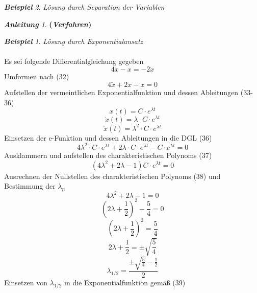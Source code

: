 \documentclass[a4paper,11pt]{article}
\theoremstyle{remark}
\newtheorem{example}{\textbf{Beispiel}}[section]
\newtheorem{guide}{\textbf{Anleitung}}[section]
\begin{document}
\begin{example}{\textit{Lösung durch Separation der Variablen}}
\begin{guide}{\textbf{(\textit{Verfahren})}}
\begin{equation}
\end{equation}
\vspace{0,5cm}
\begin{example}{\textit{Lösung durch Exponentialansatz}} \\ \\
Es sei folgende Differentialgleichung gegeben
\begin{equation}
4\ddot{x}-x=-2\dot{x}
\end{equation}
Umformen nach (32)
\begin{equation}
4\ddot{x}+2\dot{x}-x=0
\end{equation}
Aufstellen der vermeintlichen Exponentialfunktion und dessen Ableitungen (33-36)
\begin{equation}
x(t)=C\cdot e^{\lambda t}
\end{equation}
\begin{equation}
\dot{x}(t)=\lambda \cdot C\cdot e^{\lambda t}
\end{equation}
\begin{equation}
\ddot{x}(t)=\lambda^2 \cdot C\cdot e^{\lambda t}
\end{equation}
Einsetzen der e-Funktion und dessen Ableitungen in die DGL (36)
\begin{equation}
4\lambda^2 \cdot C\cdot e^{\lambda t}+2\lambda \cdot C\cdot e^{\lambda t}-C\cdot e^{\lambda t}=0
\end{equation}
Ausklammern und aufstellen des charakteristischen Polynoms (37)
\begin{equation}
(4\lambda^2+2\lambda-1)C\cdot e^{\lambda t}=0
\end{equation}
Ausrechnen der Nullstellen des charakteristischen Polynoms (38) und Bestimmung der $\lambda_n$
\begin{equation}
4\lambda^2+2\lambda-1=0
\end{equation}
\begin{equation}
(2\lambda+\frac{1}{2})^2-\frac{5}{4}=0
\end{equation}
\begin{equation}
(2\lambda+\frac{1}{2})^2=\frac{5}{4}
\end{equation}
\begin{equation}
2\lambda+\frac{1}{2}=\pm \sqrt{\frac{5}{4}}
\end{equation}
\begin{equation}
\lambda_{1/2}=\frac{\pm \sqrt{\frac{5}{4}}-\frac{1}{2}}{2}
\end{equation}
Einsetzen von $\lambda_{1/2}$ in die Exponentialfunktion gemäß (39)
\begin{equation}

\end{equation}
\end{example}
\end{guide}
\end{example}
\end{document}
